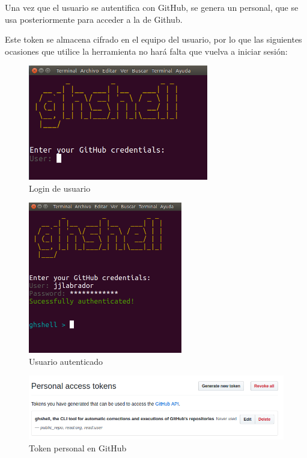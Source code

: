     Una vez que el usuario se autentifica con GitHub, se genera un \ceit{\ref{apend1:token}} personal, que se usa posteriormente para acceder a la \ceit{\ref{apend1:api}} de Github. 
\bigskip
   
   Este token se almacena cifrado en el equipo del usuario, por lo que las siguientes ocasiones que utilice la herramienta no hará falta que vuelva a iniciar sesión:
        
        \begin{figure}[H]
		\begin{center}
		\includegraphics[width=0.7\textwidth]{images/ghshell1}
		\caption{Login de usuario}
		\label{fig:ghshell1}
		\end{center}
		\end{figure}
		
		\begin{figure}[H]
		\begin{center}
		\includegraphics[width=0.6\textwidth]{images/ghshell2-1}
		\caption{Usuario autenticado}
		\label{fig:ghshell2-1}
		\end{center}
		\end{figure}
		
		\begin{figure}[H]
		\begin{center}
		\includegraphics[width=1\textwidth]{images/ghshell2-3}
		\caption{Token personal en GitHub}
		\label{fig:ghshell2-3}
		\end{center}
		\end{figure}
		
